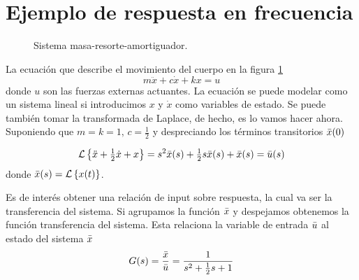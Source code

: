 \section{Ejemplo de respuesta en frecuencia}
\begin{figure}[htb!]
	\centering
	\caption{Sistema masa-resorte-amortiguador.}
	\label{fig:dampedmasssystem}
\end{figure}

La ecuación que describe el movimiento del cuerpo en la figura \ref{fig:dampedmasssystem}
\[
m\ddot{x} + c\dot{x} + kx = u
\]
donde $u$ son las fuerzas externas actuantes. La ecuación se puede modelar como un sistema lineal si introducimos $x$ y $\dot{x}$ como variables de estado. Se puede también tomar la transformada de Laplace, de hecho, es lo vamos hacer ahora. Suponiendo que $m=k=1,\,c=\frac{1}{2}$ y despreciando los términos transitorios $\bar{x}(0)$


\[
\mathcal{L} \left\{\ddot{x} +\tfrac{1}{2}\dot{x} +x\right\} = s^2\bar{x}(s) + \tfrac{1}{2}s \bar{x}(s) + \bar{x}(s) = \bar{u}(s)
\]
donde $\bar{x}(s) = \mathcal{L} \left\{x(t)\right\}$.

Es de interés obtener una relación de input sobre respuesta, la cual va ser la transferencia del sistema. Si agrupamos la función $\bar{x}$ y despejamos obtenemos la función transferencia del sistema. Esta relaciona la variable de entrada $\bar{u}$ al estado del sistema $\bar{x}$
\[
G(s)= \frac{\bar{x}}{\bar{u}} = \frac{1}{s^2 + \tfrac{1}{2} s + 1}
\]

